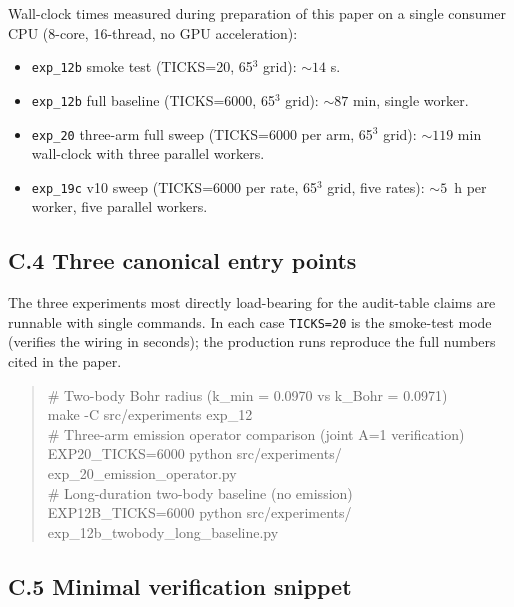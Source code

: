 Wall-clock times measured during preparation of this paper on a
single consumer CPU (8-core, 16-thread, no GPU acceleration):

\begin{itemize}\setlength{\itemsep}{0.2em}
\item \texttt{exp\_12b} smoke test (TICKS=20, 65$^3$ grid): $\sim 14$ s.
\item \texttt{exp\_12b} full baseline (TICKS=6000, 65$^3$ grid):
$\sim 87$ min, single worker.
\item \texttt{exp\_20} three-arm full sweep (TICKS=6000 per arm,
65$^3$ grid): $\sim 119$ min wall-clock with three parallel workers.
\item \texttt{exp\_19c} v10 sweep (TICKS=6000 per rate, 65$^3$ grid,
five rates): $\sim 5$~h per worker, five parallel workers.
\end{itemize}

\subsection*{C.4 Three canonical entry points}

The three experiments most directly load-bearing for the audit-table
claims are runnable with single commands.  In each case
\texttt{TICKS=20} is the smoke-test mode (verifies the wiring in
seconds); the production runs reproduce the full numbers cited in
the paper.

\begin{quote}\small\ttfamily
\# Two-body Bohr radius (k\_min = 0.0970 vs k\_Bohr = 0.0971)\\
make -C src/experiments exp\_12\\[0.5em]
\# Three-arm emission operator comparison (joint A=1 verification)\\
EXP20\_TICKS=6000 python src/experiments/\\
\hphantom{xxxx}exp\_20\_emission\_operator.py\\[0.5em]
\# Long-duration two-body baseline (no emission)\\
EXP12B\_TICKS=6000 python src/experiments/\\
\hphantom{xxxx}exp\_12b\_twobody\_long\_baseline.py
\end{quote}

\subsection*{C.5 Minimal verification snippet}

